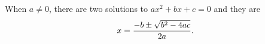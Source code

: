 When \(a \ne 0\), there are two solutions to $ax^2 + bx + c = 0$ and they are
$$x = {-b \pm \sqrt{b^2-4ac} \over 2a}.$$
